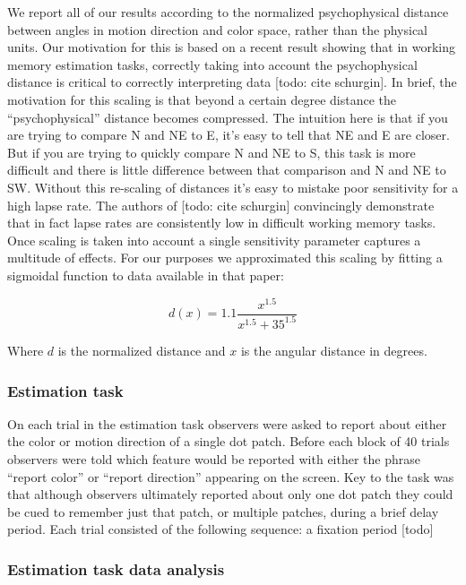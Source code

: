 We report all of our results according to the normalized psychophysical distance between angles in motion direction and color space, rather than the physical units. Our motivation for this is based on a recent result showing that in working memory estimation tasks, correctly taking into account the psychophysical distance is critical to correctly interpreting data [todo: cite schurgin]. In brief, the motivation for this scaling is that beyond a certain degree distance the ``psychophysical'' distance becomes compressed. The intuition here is that if you are trying to compare N and NE to E, it's easy to tell that NE and E are closer. But if you are trying to quickly compare N and NE to S, this task is more difficult and there is little difference between that comparison and N and NE to SW. Without this re-scaling of distances it's easy to mistake poor sensitivity for a high lapse rate. The authors of [todo: cite schurgin] convincingly demonstrate that in fact lapse rates are consistently low in difficult working memory tasks. Once scaling is taken into account a single sensitivity parameter captures a multitude of effects. For our purposes we approximated this scaling by fitting a sigmoidal function to data available in that paper: 

\begin{equation}
    d(x) = 1.1\frac{x^{1.5}}{x^{1.5}+35^{1.5}}
    \label{eqn:c5psycho}
\end{equation}

Where $d$ is the normalized distance and $x$ is the angular distance in degrees. 

\subsubsection{Estimation task}

On each trial in the estimation task observers were asked to report about either the color or motion direction of a single dot patch. Before each block of 40 trials observers were told which feature would be reported with either the phrase ``report color'' or ``report direction'' appearing on the screen. Key to the task was that although observers ultimately reported about only one dot patch they could be cued to remember just that patch, or multiple patches, during a brief delay period. Each trial consisted of the following sequence: a fixation period [todo]

\subsubsection{Estimation task data analysis}

